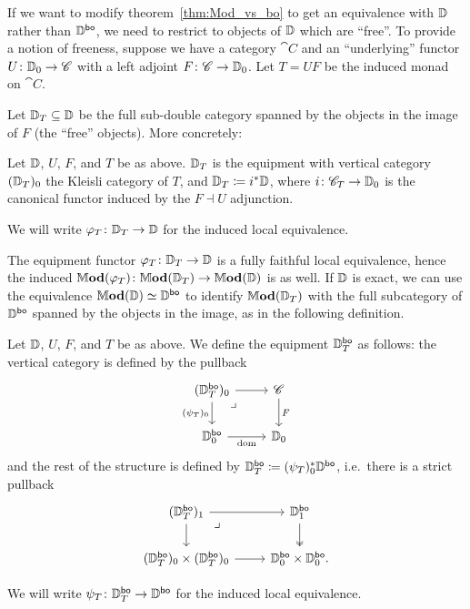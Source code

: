 \documentclass[12pt,oneside,article,draft]{memoir}
\begin{document}
If we want to modify theorem~\ref{thm:Mod_vs_bo} to get an equivalence with $\mathbb{D}$ rather than
$\mathbb{D}^{\mathsf{bo}}$, we need to restrict to objects of $\mathbb{D}$ which are ``free''. To provide a
notion of freeness, suppose we have a category $\cat{C}$ and an ``underlying'' functor
$U\colon\mathbb{D}_0\to\mathscr{C}$ with a left adjoint $F\colon\mathscr{C}\to\mathbb{D}_0$. Let $T=UF$ be the
induced monad on $\cat{C}$.

Let $\mathbb{D}_T\subseteq\mathbb{D}$ be the full sub-double category spanned by the objects in the image
of $F$ (the ``free'' objects). More concretely:

\begin{definition}
   Let $\mathbb{D}$, $U$, $F$, and $T$ be as above. $\mathbb{D}_T$ is the equipment with vertical
   category $(\mathbb{D}_T)_0$ the Kleisli category of $T$, and $\mathbb{D}_T\coloneqq i^*\mathbb{D}$,
   where $i\colon\mathscr{C}_T\to\mathbb{D}_0$ is the canonical functor induced by the $F\dashv U$
   adjunction.
   
   We will write $\varphi_T\colon\mathbb{D}_T\to\mathbb{D}$ for the induced local equivalence.
\end{definition}

The equipment functor $\varphi_T\colon\mathbb{D}_T\to\mathbb{D}$ is a fully faithful local equivalence,
hence the induced $\mathbb{M}\mathbf{od}(\varphi_T)\colon\mathbb{M}\mathbf{od}(\mathbb{D}_T)\to\mathbb{M}\mathbf{od}(\mathbb{D})$ is as well. If
$\mathbb{D}$ is exact, we can use the equivalence $\mathbb{M}\mathbf{od}(\mathbb{D})\simeq\mathbb{D}^{\mathsf{bo}}$ to identify
$\mathbb{M}\mathbf{od}(\mathbb{D}_T)$ with the full subcategory of $\mathbb{D}^{\mathsf{bo}}$ spanned by the objects in the
image, as in the following definition.

\begin{definition}
   Let $\mathbb{D}$, $U$, $F$, and $T$ be as above. We define the equipment $\mathbb{D}_T^{\mathsf{bo}}$ as
   follows: the vertical category is defined by the pullback
   \begin{equation*}
      \begin{tikzcd}
         (\dcat{D}_T^{\bo})_0 \ar[r] \ar[dr,phantom,"\lrcorner" very near start] \ar[d,"(\psi_T)_0"']
            & \cat{C} \ar[d,"F"] \\
         \dcat{D}_0^{\bo} \ar[r,"\dom"']
            & \dcat{D}_0
      \end{tikzcd}
   \end{equation*}
   and the rest of the structure is defined by
   $\mathbb{D}_T^{\mathsf{bo}}\coloneqq(\psi_T)_0^*\mathbb{D}^{\mathsf{bo}}$, i.e.\ there is a strict pullback
   \begin{equation*}
      \begin{tikzcd}
         (\dcat{D}_T^{\bo})_1 \ar[r] \ar[dr,phantom,"\lrcorner" very near start] \ar[d]
            & \dcat{D}_1^{\bo} \ar[d,two heads] \\
         (\dcat{D}_T^{\bo})_0\times(\dcat{D}_T^{\bo})_0 \ar[r]
            & \dcat{D}_0^{\bo}\times\dcat{D}_0^{\bo}.
      \end{tikzcd}
   \end{equation*}

   We will write $\psi_T\colon\mathbb{D}_T^{\mathsf{bo}}\to\mathbb{D}^{\mathsf{bo}}$ for the induced local equivalence.
\end{definition}
\end{document}
